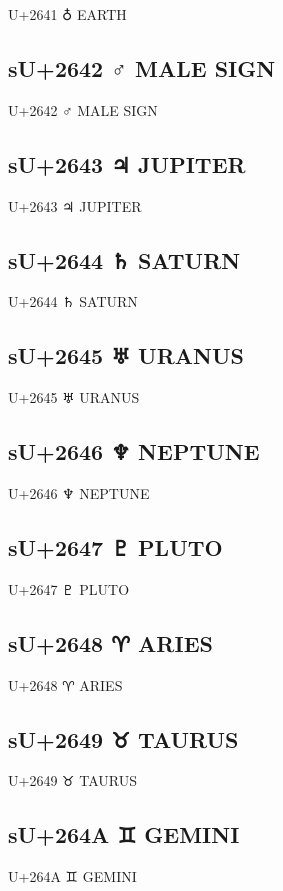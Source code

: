 U+2641 ♁ EARTH

\subsection{sU+2642 ♂ MALE SIGN}

U+2642 ♂ MALE SIGN

\subsection{sU+2643 ♃ JUPITER}

U+2643 ♃ JUPITER

\subsection{sU+2644 ♄ SATURN}

U+2644 ♄ SATURN

\subsection{sU+2645 ♅ URANUS}

U+2645 ♅ URANUS

\subsection{sU+2646 ♆ NEPTUNE}

U+2646 ♆ NEPTUNE

\subsection{sU+2647 ♇ PLUTO}

U+2647 ♇ PLUTO

\subsection{sU+2648 ♈ ARIES}

U+2648 ♈ ARIES

\subsection{sU+2649 ♉ TAURUS}

U+2649 ♉ TAURUS

\subsection{sU+264A ♊ GEMINI}

U+264A ♊ GEMINI

